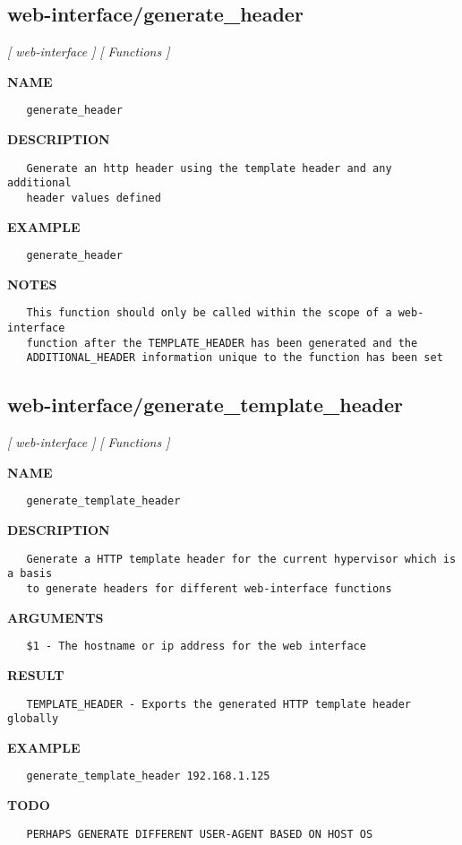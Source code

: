 \subsection{web-interface/generate\_header}
\textsl{[ web-interface ]}
\textsl{[ Functions ]}

\label{ch:robo67}
\label{ch:web_interface_generate_header}
\textbf{NAME}
\begin{verbatim}
   generate_header
\end{verbatim}
\textbf{DESCRIPTION}
\begin{verbatim}
   Generate an http header using the template header and any additional 
   header values defined
\end{verbatim}
\textbf{EXAMPLE}
\begin{verbatim}
   generate_header
\end{verbatim}
\textbf{NOTES}
\begin{verbatim}
   This function should only be called within the scope of a web-interface
   function after the TEMPLATE_HEADER has been generated and the 
   ADDITIONAL_HEADER information unique to the function has been set
\end{verbatim}
\newpage
\subsection{web-interface/generate\_template\_header}
\textsl{[ web-interface ]}
\textsl{[ Functions ]}

\label{ch:robo68}
\label{ch:web_interface_generate_template_header}
\textbf{NAME}
\begin{verbatim}
   generate_template_header
\end{verbatim}
\textbf{DESCRIPTION}
\begin{verbatim}
   Generate a HTTP template header for the current hypervisor which is a basis
   to generate headers for different web-interface functions
\end{verbatim}
\textbf{ARGUMENTS}
\begin{verbatim}
   $1 - The hostname or ip address for the web interface
\end{verbatim}
\textbf{RESULT}
\begin{verbatim}
   TEMPLATE_HEADER - Exports the generated HTTP template header globally
\end{verbatim}
\textbf{EXAMPLE}
\begin{verbatim}
   generate_template_header 192.168.1.125
\end{verbatim}
\textbf{TODO}
\begin{verbatim}
   PERHAPS GENERATE DIFFERENT USER-AGENT BASED ON HOST OS
\end{verbatim}
\newpage
